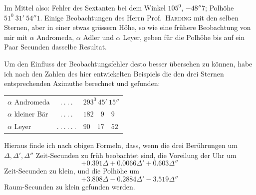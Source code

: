 Im Mittel also: Fehler des Sextanten bei dem Winkel $105^0$, $-48''7$;
Polhöhe $51^0\ 31'\ 54''1$. Einige Beobachtungen des Herrn Prof.\ \textsc{Harding} mit den%
%
selben Sternen, aber in einer etwas grössern Höhe, so wie eine frühere Beobachtung von mir mit $\alpha$ Andromeda, $\alpha$ Adler und $\alpha$ Leyer, geben für die Polhöhe bis auf ein Paar Secunden dasselbe Resultat.

Um den Einfluss der Beobachtungsfehler desto besser übersehen zu können, habe ich nach den Zahlen des hier entwickelten Beispiels die den drei Sternen entsprechenden Azimuthe berechnet und gefunden:
\begin{center}
\begin{tabular}{lcl}
$\alpha$ Andromeda & $.\ .\ .\ .$ & $293^{0}\ 45'\ 15''$\\
$\alpha$ kleiner Bär & $.\ .\ .\ .$ & $182\quad9\quad9$\\
$\alpha$ Leyer & $.\ .\ .\ .\ .\ .$ & $90\quad17\quad52$
\end{tabular}
\end{center}
Hieraus finde ich nach obigen Formeln, dass, wenn die drei Berührungen um $\Delta,\Delta',\Delta''$ Zeit-Secunden zu früh beobachtet sind, die Voreilung der Uhr um
\[
+0.391\Delta+0.0066\Delta'+0.603\Delta''
\]
Zeit-Secunden zu klein, und die Polhöhe um
\[
+3.808\Delta-0.2884\Delta'-3.519\Delta''
\]
Raum-Secunden zu klein gefunden werden.

